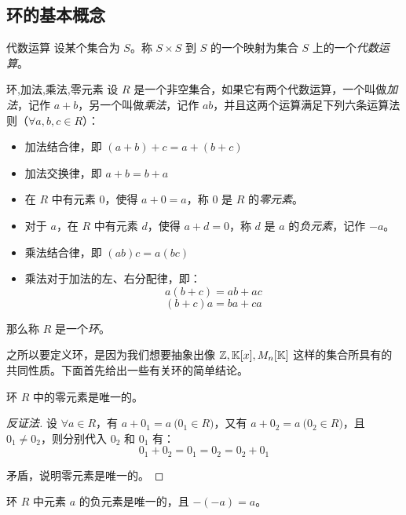 \subsection{环的基本概念}

\begin{definition}{代数运算}
	设某个集合为 $S$。称 $S \times S$ 到 $S$ 的一个映射为集合 $S$ 上的一个\emph{代数运算}。
\end{definition}

\begin{definition}{环,加法,乘法,零元素}
	设 $R$ 是一个非空集合，如果它有两个代数运算，一个叫做\emph{加法}，记作 $a + b$，另一个叫做\emph{乘法}，记作 $ab$，并且这两个运算满足下列六条运算法则（$\forall a, b, c \in R$）：
	\begin{itemize}
		\item 加法结合律，即 $(a + b) + c = a + (b + c)$
		\item 加法交换律，即 $a + b = b + a$
		\item 在 $R$ 中有元素 $0$，使得 $a + 0 = a$，称 $0$ 是 $R$ 的\emph{零元素}。
		\item 对于 $a$，在 $R$ 中有元素 $d$，使得 $a + d = 0$，称 $d$ 是 $a$ 的\emph{负元素}，记作 $-a$。
		\item 乘法结合律，即 $(ab)c = a(bc)$
		\item 乘法对于加法的左、右分配律，即：
		$$
		a(b + c) = ab + ac
		$$$$
		(b + c) a = ba + ca
		$$
	\end{itemize}
	那么称 $R$ 是一个\emph{环}。
\end{definition}

之所以要定义环，是因为我们想要抽象出像 $\mathbb Z, \mathbb K[x], M_n[\mathbb K]$ 这样的集合所具有的共同性质。下面首先给出一些有关环的简单结论。

\begin{proposition}
	环 $R$ 中的零元素是唯一的。
\end{proposition}

\begin{proof}[反证法]
	设 $\forall a \in R$，有 $a + 0_1 = a \pod{0_1 \in R}$，又有 $a + 0_2 = a \pod{0_2 \in R}$，且 $0_1 \ne 0_2$，则分别代入 $0_2$ 和 $0_1$ 有：
	$$
	0_1 + 0_2 = 0_1 = 0_2 = 0_2 + 0_1
	$$

	矛盾，说明零元素是唯一的。
\end{proof}

\begin{theorem}
	环 $R$ 中元素 $a$ 的负元素是唯一的，且 $-(-a) = a$。
\end{theorem}

